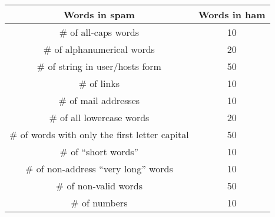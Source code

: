 \begin{center}
\begin{tabular}{cc}
\toprule
Words in spam & Words in ham \\
\midrule
\# of all-caps words                            & 10 \\
\# of alphanumerical words                      & 20 \\
\# of string in user/hosts form                 & 50 \\
\# of links                                     & 10 \\
\# of mail addresses                            & 10 \\
\# of all lowercase words                       & 20 \\
\# of words with only the first letter capital  & 50 \\
\# of ``short words''                           & 10 \\
\# of non-address ``very long'' words           & 10 \\
\# of non-valid words                           & 50 \\
\# of numbers                                   & 10 \\
\bottomrule
\end{tabular}
\label{tab:commonwords}
\end{center}
